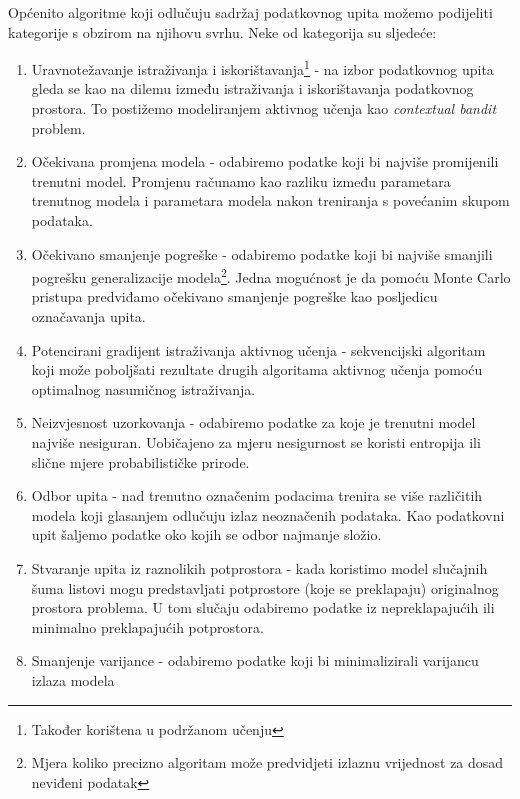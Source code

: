 \documentclass[times, utf8, zavrsni, numeric]{fer}
\begin{document}
Općenito algoritme koji odlučuju sadržaj podatkovnog upita možemo podijeliti kategorije s obzirom na njihovu svrhu. Neke od kategorija su sljedeće:
\begin{enumerate}
    \item Uravnotežavanje istraživanja i iskorištavanja\footnote{Također korištena u podržanom učenju} - na izbor podatkovnog upita gleda se kao na dilemu između istraživanja i iskorištavanja podatkovnog prostora. To postižemo modeliranjem aktivnog učenja kao \textit{contextual bandit} problem.
    \item Očekivana promjena modela - odabiremo podatke koji bi najviše promijenili trenutni model. Promjenu računamo kao razliku između parametara trenutnog modela i parametara modela nakon treniranja s povećanim skupom podataka. \citep{cai2013maximizing}
    \item Očekivano smanjenje pogreške - odabiremo podatke koji bi najviše smanjili pogrešku generalizacije modela\footnote{Mjera koliko precizno algoritam može predvidjeti izlaznu vrijednost za dosad neviđeni podatak}. Jedna mogućnost je da pomoću Monte Carlo pristupa predviđamo očekivano smanjenje pogreške kao posljedicu označavanja upita. \citep{roy2001toward}
    \item Potencirani gradijent istraživanja aktivnog učenja - sekvencijski algoritam koji može poboljšati rezultate drugih algoritama aktivnog učenja pomoću optimalnog nasumičnog istraživanja. \citep{bouneffouf2016exponentiated}
    \item Neizvjesnost uzorkovanja - odabiremo podatke za koje je trenutni model najviše nesiguran. Uobičajeno za mjeru nesigurnost se koristi entropija ili slične mjere probabilističke prirode.
    \item Odbor upita - nad trenutno označenim podacima trenira se više različitih modela koji glasanjem odlučuju izlaz neoznačenih podataka. Kao podatkovni upit šaljemo podatke oko kojih se odbor najmanje složio. 
    \item Stvaranje upita iz raznolikih potprostora -  kada koristimo model slučajnih šuma listovi mogu predstavljati potprostore (koje se preklapaju) originalnog prostora problema. U tom slučaju odabiremo podatke iz nepreklapajućih ili minimalno preklapajućih potprostora. \citep{github:shubhomoydas:ad_examples}
    \item Smanjenje varijance - odabiremo podatke koji bi minimalizirali varijancu izlaza modela

\end{enumerate}
\end{document}
